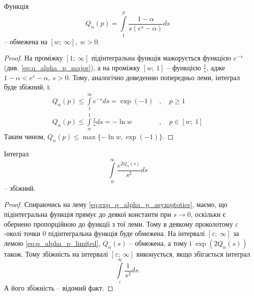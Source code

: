 \begin{lem}
	\label{eq:q_alpha_p_limited}
	Функція
	$$
		Q_\alpha(p) = \int\limits_1^p \frac{1- \alpha}{s(e^s - \alpha)} ds
	$$
	  – обмежена на $[w; ~\infty], \; w>0$.
\end{lem}
\begin{proof}
	На проміжку $[1; ~\infty]$ підінтегральна функція мажорується функцією $e^{-s}$ (див. \eqref{eq:q_alpha_p_major}), а на проміжку $[w; ~1]$ – функцією $\frac{1}{s}$, адже $1- \alpha < e^s - \alpha, ~ s > 0$. Тому, аналогічно доведенню попередньо леми, інтеграл буде збіжний, і:
	\begin{align*}
		Q_\alpha(p) \leq \int\limits_1^\infty e^{-s} ds = \exp(-1) &,\quad p \geq 1 \\
		Q_\alpha(p) \leq \int\limits_w^1 \frac{1}{s} ds = - \ln w &, \quad p \in [w;~1]
	\end{align*}
	Таким чином, $Q_\alpha(p) \leq \max\{-\ln w, \exp(-1)\}$.
\end{proof}

\begin{lem}
	Інтеграл
	$$
		\int\limits_0^\infty \frac{e^{2Q_\alpha(s)}}{s^2} ds
	$$
	– збіжний.
\end{lem}
\begin{proof}
	Спираючись на лему \eqref{eq:exp_q_alpha_p_asymptotics}, маємо, що підінтегральна функція прямує до деякої константи при $s \rightarrow 0$, оскільки є обернено пропорційною до функції з тої леми. Тому в деякому проколотому $\varepsilon$-околі точки 0 підінтегральна функція буде обмежена. На інтервалі $[\varepsilon; ~\infty]$ за лемою \eqref{eq:q_alpha_p_limited}, $Q_\alpha(s)$ – обмежена, а тому і $\exp(2Q_\alpha(s))$ також. Тому збіжність на інтервалі $[\varepsilon; ~\infty]$ виконується, якщо збігається інтеграл
	\[
		\int\limits_\varepsilon^\infty \frac{1}{s^2} ds.
	\]
	А його збіжність – відомий факт.
\end{proof}
		
